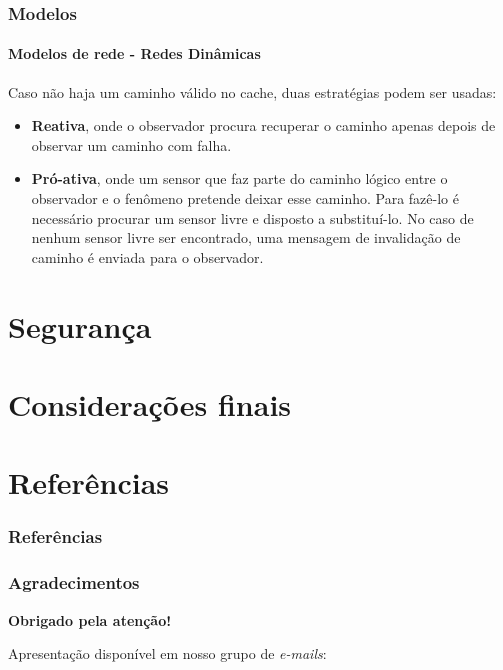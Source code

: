 \documentclass[notes]{beamer}
\begin{document}
\begin{frame}
\frametitle{Modelos}
\framesubtitle{Modelos de rede - Redes Dinâmicas}

\begin{block}

Caso não haja um caminho válido no cache, duas estratégias podem ser usadas:

\begin{itemize}

\item \textbf{Reativa}, onde o observador procura recuperar o caminho apenas depois de observar um caminho com falha. \pause

\item \textbf{Pró-ativa}, onde um sensor que faz parte do caminho lógico entre o observador e o fenômeno pretende deixar esse caminho. Para fazê-lo é necessário procurar um sensor livre e disposto a substituí-lo. No caso de nenhum sensor livre ser encontrado, uma mensagem de invalidação de caminho é enviada para o observador. 

\end{itemize}

\end{block}

\end{frame}

\section{Segurança}

\section{Considerações finais}

\section{Referências}
\begin{frame}
\frametitle{Referências}




\end{frame}

\begin{frame}
\frametitle{Agradecimentos}
\vskip20pt

\begin{center}
{\bf \color{alert} Obrigado pela atenção!}
\end{center}

\vskip20pt

\begin{center}
Apresentação disponível em nosso grupo de \textit{e-mails}:\\
\vskip12pt
\end{center}

\titlepage
\end{frame}
\end{document}
